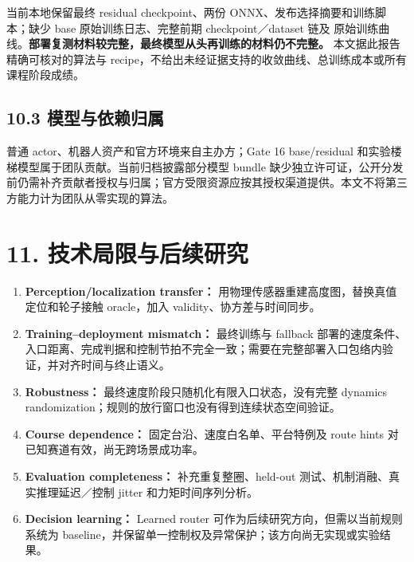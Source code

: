 \documentclass[
  10pt,
  a4paper,
]{article}
\providecommand{\tightlist}{%
  \setlength{\itemsep}{0pt}\setlength{\parskip}{0pt}}
\begin{document}
当前本地保留最终 residual checkpoint、两份
ONNX、发布选择摘要和训练脚本；缺少 base 原始训练日志、完整前期
checkpoint／dataset 链及 {\ttfamily\small{}}
原始训练曲线。\textbf{部署复测材料较完整，最终模型从头再训练的材料仍不完整。}
本文据此报告精确可核对的算法与
recipe，不给出未经证据支持的收敛曲线、总训练成本或所有课程阶段成绩。

\subsection{10.3
模型与依赖归属}\label{ux6a21ux578bux4e0eux4f9dux8d56ux5f52ux5c5e}

普通 actor、机器人资产和官方环境来自主办方；Gate 16 base/residual
和实验楼梯模型属于团队贡献。当前归档披露部分模型 bundle
缺少独立许可证，公开分发前仍需补齐贡献者授权与归属；官方受限资源应按其授权渠道提供。本文不将第三方能力计为团队从零实现的算法。

\FloatBarrier

\section{11.
技术局限与后续研究}\label{ux6280ux672fux5c40ux9650ux4e0eux540eux7eedux7814ux7a76}

\begin{enumerate}
\def\labelenumi{\arabic{enumi}.}
\tightlist
\item
  \textbf{Perception/localization transfer：}
  用物理传感器重建高度图，替换真值定位和轮子接触 oracle，加入
  validity、协方差与时间同步。
\item
  \textbf{Training--deployment mismatch：} 最终训练与 fallback
  部署的速度条件、入口距离、完成判据和控制节拍不完全一致；需要在完整部署入口包络内验证，并对齐时间与终止语义。
\item
  \textbf{Robustness：} 最终速度阶段只随机化有限入口状态，没有完整
  dynamics randomization；规则的放行窗口也没有得到连续状态空间验证。
\item
  \textbf{Course dependence：} 固定台沿、速度白名单、平台特例及 route
  hints 对已知赛道有效，尚无跨场景成功率。
\item
  \textbf{Evaluation completeness：} 补充重复整圈、held-out
  测试、机制消融、真实推理延迟／控制 jitter 和力矩时间序列分析。
\item
  \textbf{Decision learning：} Learned router
  可作为后续研究方向，但需以当前规则系统为
  baseline，并保留单一控制权及异常保护；该方向尚无实现或实验结果。
\end{enumerate}
\end{document}
